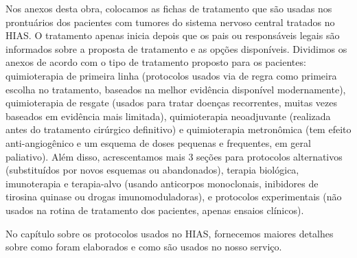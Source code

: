 \documentclass[graybox]{svmult}
\begin{document}
Nos anexos desta obra, colocamos as fichas de tratamento que são usadas nos prontuários dos pacientes com tumores do sistema nervoso central tratados no HIAS. O tratamento apenas inicia depois que os pais ou responsáveis legais são informados sobre a proposta de tratamento e as opções disponíveis. Dividimos os anexos de acordo com o tipo de tratamento proposto para os pacientes: quimioterapia de primeira linha (protocolos usados via de regra como primeira escolha no tratamento, baseados na melhor evidência disponível modernamente), quimioterapia de resgate (usados para tratar doenças recorrentes, muitas vezes baseados em evidência mais limitada), quimioterapia neoadjuvante (realizada antes do tratamento cirúrgico definitivo) e quimioterapia metronômica (tem efeito anti-angiogênico e um esquema de doses pequenas e frequentes, em geral paliativo). Além disso, acrescentamos mais 3 seções para protocolos alternativos (substituídos por novos esquemas ou abandonados), terapia biológica, imunoterapia e terapia-alvo (usando anticorpos monoclonais, inibidores de tirosina quinase ou drogas imunomoduladoras), e protocolos experimentais (não usados na rotina de tratamento dos pacientes, apenas ensaios clínicos).

No capítulo sobre os protocolos usados no HIAS, fornecemos maiores detalhes sobre como foram elaborados e como são usados no nosso serviço.



\end{document}
